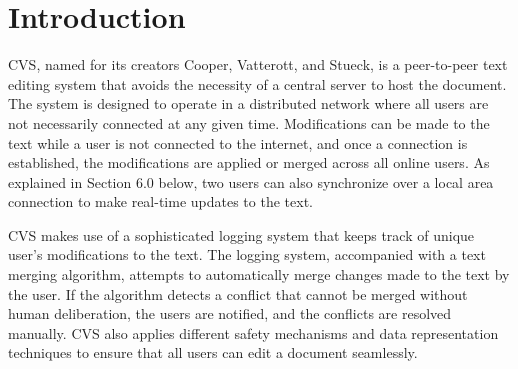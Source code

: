 \section{Introduction}

CVS, named for its creators Cooper, Vatterott, and Stueck, is a peer-to-peer text editing system that avoids the necessity of a central server to host the document. The system is designed to operate in a distributed network where all users are not necessarily connected at any given time. Modifications can be made to the text while a user is not connected to the internet, and once a connection is established, the modifications are applied or merged across all online users. As explained in Section 6.0 below, two users can also synchronize over a local area connection to make real-time updates to the text. 

CVS makes use of a sophisticated logging system that keeps track of unique user's modifications to the text. The logging system, accompanied with a text merging algorithm, attempts to automatically merge changes made to the text by the user. If the algorithm detects a conflict that cannot be merged without human deliberation, the users are notified, and the conflicts are resolved manually. CVS also applies different safety mechanisms and data representation techniques to ensure that all users can edit a document seamlessly.